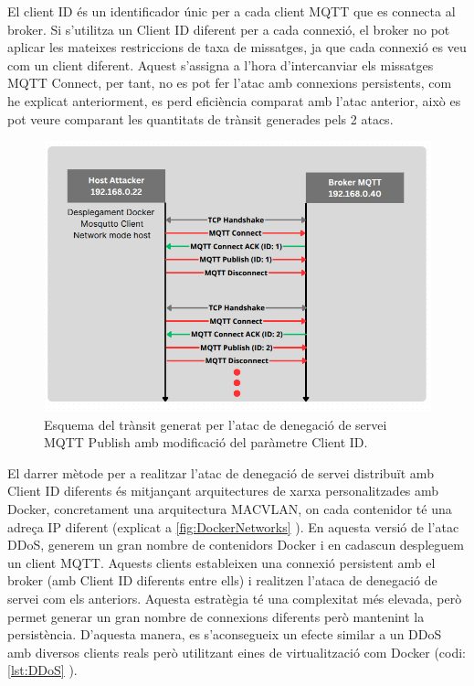 El client ID és un identificador únic per a cada client MQTT que es connecta al broker. Si s'utilitza un Client ID diferent per a cada connexió, el broker no pot aplicar les mateixes restriccions de taxa de missatges, ja que cada connexió es veu com un client diferent. Aquest s'assigna a l'hora d'intercanviar els missatges MQTT Connect, per tant, no es pot fer l'atac amb connexions persistents, com he explicat anteriorment, es perd eficiència comparat amb l'atac anterior, això es pot veure comparant les quantitats de trànsit generades pels 2 atacs.

  \begin{figure}[H]
    \centering
    \includegraphics[width=1\textwidth]{img/DoSclientID.png}
    \caption{Esquema del trànsit generat per l'atac de denegació de servei MQTT Publish amb modificació del paràmetre Client ID.}
    \label{fig:DoSclientId}
  \end{figure}

El darrer mètode per a realitzar l'atac de denegació de servei distribuït amb Client ID diferents és mitjançant arquitectures de xarxa personalitzades amb Docker, concretament una arquitectura MACVLAN, on cada contenidor té una adreça IP diferent (explicat a \ref{fig:DockerNetworks} ). En aquesta versió de l'atac DDoS, generem un gran nombre de contenidors Docker i en cadascun despleguem un client MQTT. Aquests clients estableixen una connexió persistent amb el broker (amb Client ID diferents entre ells) i realitzen l'ataca de denegació de servei com els anteriors. Aquesta estratègia té una complexitat més elevada, però permet generar un gran nombre de connexions diferents però mantenint la persistència. D'aquesta manera, es s'aconsegueix un efecte similar a un DDoS amb diversos clients reals però utilitzant eines de virtualització com Docker (codi: \ref{lst:DDoS} ).


